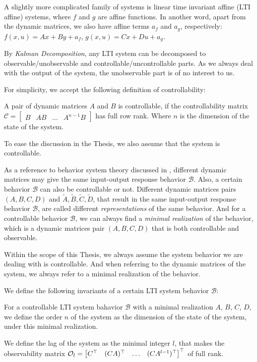 A slightly more complicated family of systems is linear time invariant affine (LTI affine) systems, where $f$ and $g$ are affine functions.
In another word, apart from the dynamic matrices, we also have affine terms $a_f$ and $a_g$, respectively:
$f\left(x,u\right) = A x + B y + a_f$, $g\left(x, u\right) = C x + D u + a_g$.

By \emph{Kalman Decomposition}, any LTI system can be decomposed to observable/unobservable and controllable/uncontrollable parts.
As we always deal with the output of the system, the unobservable part is of no interest to us.

For simplicity, we accept the following definition of controllability:

\begin{definition}\label{def:lti-controllability}
    A pair of dynamic matrices $A$ and $B$ is controllable, if the controllability matrix $\mathcal{C} = \begin{bmatrix} B & A B & \ldots & A^{n-1} B \end{bmatrix}$ has full row rank.
    Where $n$ is the dimension of the state of the system.
\end{definition}

To ease the discussion in the Thesis, we also assume that the system is controllable.

As a reference to behavior system theory discussed in \cite{markovsky_behavioral_2021}, different dynamic matrices may give the same input-output response behavior $\mathscr{B}$.
Also, a certain behavior $\mathscr{B}$ can also be controllable or not.
Different dynamic matrices pairs $(A, B, C, D)$ and $\tilde{A}, \tilde{B}, \tilde{C}, \tilde{D}$, that result in the same input-output response behavior $\mathscr{B}$, are called different \emph{representations} of the same behavior.
And for a controllable behavior $\mathscr{B}$, we can always find a \emph{minimal realization} of the behavior, which is a dynamic matrices pair $(A, B, C, D)$ that is both controllable and observable.

Within the scope of this Thesis, we always assume the system behavior we are dealing with is controllable.
And when referring to the dynamic matrices of the system, we always refer to a minimal realization of the behavior.

We define the following invariants of a certain LTI system behavior $\mathscr{B}$:

\begin{definition}\label{def:order-lag}
    For a controllable LTI system bahavior $\mathscr{B}$ with a minimal realization $A$, $B$, $C$, $D$, we define the order $n$ of the system as the dimension of the state of the system, under this minimal realization.

    We define the lag of the system as the minimal integer $l$, that makes the observability matrix $\mathcal{O}_l = \begin{bmatrix} C^{\top} & (C A)^{\top} & \ldots & (C A^{l-1})^{\top} \end{bmatrix}^{\top}$ of full rank.
\end{definition}

